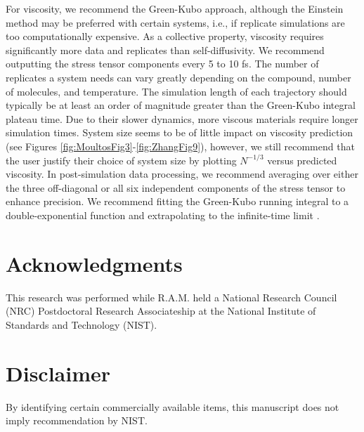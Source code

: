 \documentclass[9pt,bestpractices]{livecoms}
\begin{document}
For viscosity, we recommend the Green-Kubo approach, although the Einstein method may be preferred with certain systems, i.e., if replicate simulations are too computationally expensive. As a collective property, viscosity requires significantly more data and replicates than self-diffusivity. We recommend outputting the stress tensor components every 5 to 10 fs. The number of replicates a system needs can vary greatly depending on the compound, number of molecules, and temperature. The simulation length of each trajectory should typically be at least an order of magnitude greater than the Green-Kubo integral plateau time. Due to their slower dynamics, more viscous materials require longer simulation times. System size seems to be of little impact on viscosity prediction (see Figures \ref{fig:MoultosFig3}-\ref{fig:ZhangFig9}), however, we still recommend that the user justify their choice of system size by plotting $N^{-1/3}$ versus predicted viscosity. In post-simulation data processing, we recommend averaging over either the three off-diagonal or all six independent components of the stress tensor to enhance precision.  We recommend fitting the Green-Kubo running integral to a double-exponential function and extrapolating to the infinite-time limit \cite{Zhang2015}.



\section*{Acknowledgments}

This research was performed while R.A.M. held a National Research Council (NRC) Postdoctoral Research Associateship at the National Institute of Standards and Technology (NIST).

\section*{Disclaimer}

By identifying certain commercially available items, this manuscript does not imply recommendation by NIST.



\end{document}
